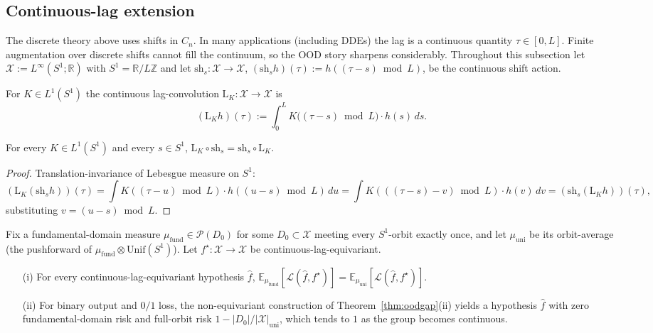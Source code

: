 \subsection{Continuous-lag extension}
\label{sec:continuous-lag}

The discrete theory above uses shifts in $C_n$.  In many applications
(including DDEs) the lag is a continuous quantity $\tau \in [0, L]$.
Finite augmentation over discrete shifts cannot fill the continuum,
so the OOD story sharpens considerably.  Throughout this subsection
let $\mathcal{X} := L^\infty(S^1; \mathbb{R})$ with $S^1 = \mathbb{R}/L\mathbb{Z}$ and let
$\mathrm{sh}_s : \mathcal{X} \to \mathcal{X}$, $(\mathrm{sh}_s h)(\tau) := h((\tau - s) \bmod L)$, be
the continuous shift action.

\begin{definition}
\label{def:continuous-lagconv}
For $K \in L^1(S^1)$ the continuous lag-convolution
$\mathrm{L}_K : \mathcal{X} \to \mathcal{X}$ is
\[
  (\mathrm{L}_K h)(\tau) := \int_0^L K\bigl((\tau - s) \bmod L\bigr) \cdot h(s)\,ds.
\]
\end{definition}

\begin{theorem}
\label{thm:continuous-layer-equiv}
For every $K \in L^1(S^1)$ and every $s \in S^1$,
$\mathrm{L}_K \circ \mathrm{sh}_s = \mathrm{sh}_s \circ \mathrm{L}_K$.
\end{theorem}

\begin{proof}
Translation-invariance of Lebesgue measure on $S^1$:
\[
  (\mathrm{L}_K (\mathrm{sh}_s h))(\tau)
  = \int K((\tau - u) \bmod L) \cdot h((u - s) \bmod L)\, du
  = \int K(((\tau - s) - v) \bmod L) \cdot h(v)\, dv
  = (\mathrm{sh}_s (\mathrm{L}_K h))(\tau),
\]
substituting $v = (u - s) \bmod L$.
\end{proof}

\begin{theorem}
\label{thm:continuous-ood-gap}
Fix a fundamental-domain measure $\mu_\mathrm{fund} \in \mathcal{P}(D_0)$ for
some $D_0 \subset \mathcal{X}$ meeting every $S^1$-orbit exactly once, and
let $\mu_\mathrm{uni}$ be its orbit-average (the pushforward of
$\mu_\mathrm{fund} \otimes \mathrm{Unif}(S^1)$).  Let $f^\star : \mathcal{X} \to \mathcal{X}$
be continuous-lag-equivariant.
\begin{enumerate}
\item[(i)] For every continuous-lag-equivariant hypothesis $\hat{f}$,
$\mathbb{E}_{\mu_\mathrm{fund}}[\mathcal{L}(\hat{f}, f^\star)] = \mathbb{E}_{\mu_\mathrm{uni}}[\mathcal{L}(\hat{f}, f^\star)]$.
\item[(ii)] For binary output and $0/1$ loss, the non-equivariant
construction of Theorem~\ref{thm:oodgap}(ii) yields a hypothesis
$\hat{f}$ with zero fundamental-domain risk and full-orbit risk
$1 - |D_0|/|\mathcal{X}|_\mathrm{uni}$, which tends to $1$ as the group becomes
continuous.
\end{enumerate}
\end{theorem}

